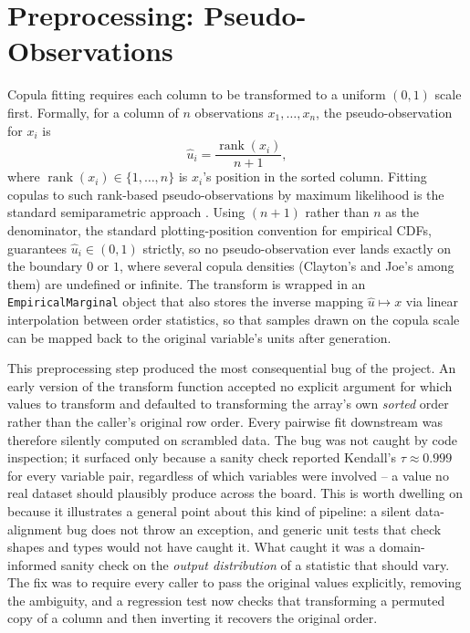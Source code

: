 \documentclass[
  english,
  class=report,
  accentcolor=2c,
  marginpar=false,
  parskip=half-,
  fontsize=11pt,
  ruledheaders=false,
  pdfa=false,
  IMRAD=false,
  thesis={type=master}
]{tudapub}
\begin{document}
\section{Preprocessing: Pseudo-Observations}
Copula fitting requires each column to be transformed to a uniform
$(0,1)$ scale first. Formally, for a column of $n$ observations
$x_1,\dots,x_n$, the pseudo-observation for $x_i$ is
\begin{equation}
\hat{u}_i = \frac{\operatorname{rank}(x_i)}{n+1},
\label{eq:pseudo-obs}
\end{equation}
where $\operatorname{rank}(x_i) \in \{1,\dots,n\}$ is $x_i$'s position in
the sorted column. Fitting copulas to such rank-based pseudo-observations by maximum likelihood
is the standard semiparametric approach \parencite{genest1995}. Using
$(n+1)$ rather than $n$ as the denominator, the
standard plotting-position convention for empirical CDFs, guarantees
$\hat{u}_i \in (0,1)$ strictly, so no pseudo-observation ever lands exactly
on the boundary $0$ or $1$, where several copula densities (Clayton's and
Joe's among them) are undefined or infinite. The transform is wrapped in an
\texttt{EmpiricalMarginal} object that also stores the inverse mapping
$\hat{u} \mapsto x$ via linear interpolation between order statistics, so
that samples drawn on the copula scale can be mapped back to the original
variable's units after generation.

This preprocessing step produced the most consequential bug of the project.
An early version of the transform function accepted no explicit argument for
which values to transform and defaulted to transforming the array's own
\emph{sorted} order rather than the caller's original row order. Every
pairwise fit downstream was therefore silently computed on scrambled data.
The bug was not caught by code inspection; it surfaced only because a sanity
check reported Kendall's $\tau \approx 0.999$ for every variable pair,
regardless of which variables were involved -- a value no real dataset
should plausibly produce across the board. This is worth dwelling on
because it illustrates a general point about this kind of pipeline: a silent
data-alignment bug does not throw an exception, and generic unit tests that
check shapes and types would not have caught it. What caught it was a
domain-informed sanity check on the \emph{output distribution} of a
statistic that should vary. The fix was to require every caller to pass the
original values explicitly, removing the ambiguity, and a regression test
now checks that transforming a permuted copy of a column and then inverting
it recovers the original order.
\end{document}
